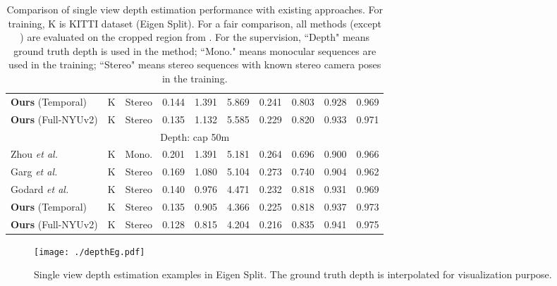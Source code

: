 \documentclass[10pt,twocolumn,letterpaper]{article}
\begin{document}
\begin{table*}[t]
\begin{center}
{\begin{tabular}{| l c c || c c c c | c c c|}
\textbf{Ours} (Temporal) & 
K & Stereo & 
0.144 & 1.391 & 5.869 & 0.241 &
0.803 & 0.928 & 0.969 \\

\textbf{Ours} (Full-NYUv2) & 
K & Stereo & 
0.135 & 1.132 & 5.585 & 0.229 &
0.820 & 0.933 & 0.971 \\

 \hline\hline
\multicolumn{10}{|c|}{Depth: cap 50m} \\
\hline

Zhou \textit{et al.} \cite{zhou2017sfmlearner}  & 
K & Mono. & 
0.201 & 1.391 & 5.181 & 0.264 &
0.696 & 0.900 & 0.966\\

Garg \textit{et al.} \cite{garg2016depth}  & 
K & Stereo & 
0.169 & 1.080 & 5.104 & 0.273 &
0.740 & 0.904 & 0.962\\


Godard \textit{et al.} \cite{godard2016depth} & 
K & Stereo & 
0.140 & 0.976 & 4.471 & 0.232 &
0.818 & 0.931 & 0.969\\

\textbf{Ours} (Temporal) & 
K & Stereo &
0.135 & 0.905 & 4.366 & 0.225 &
0.818 & 0.937 & 0.973\\

\textbf{Ours} (Full-NYUv2) & 
K & Stereo & 
0.128 & 0.815 & 4.204 & 0.216 &
0.835 & 0.941 & 0.975\\

\hline
\end{tabular}
}
\end{center}
\caption{Comparison of single view depth estimation performance with existing approaches. For training, K is KITTI dataset (Eigen Split). For a fair comparison, all methods (except \cite{eigen2014depth}) are evaluated on the cropped region from \cite{godard2016depth}. For the supervision, ``Depth" means ground truth depth is used in the method; ``Mono." means monocular sequences are used in the training; ``Stereo" means stereo sequences with known stereo camera poses in the training. 
}
\label{table:depth_benchmark}
\end{table*}


\begin{figure*}[!t] 
\centering
\texttt{[image: ./depthEg.pdf]}
\caption{Single view depth estimation examples in Eigen Split. The ground truth depth is interpolated for visualization purpose. }\label{fig:depthEg}
\vspace{-5mm}
\end{figure*}
\end{document}
